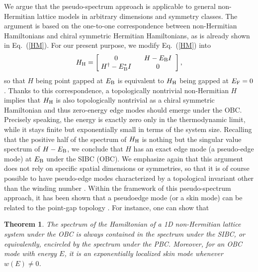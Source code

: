 \documentclass{tADP2e}
\theoremstyle{plain}
\theoremstyle{plain}
\newtheorem{theorem}{Theorem}[section]
\theoremstyle{definition}
\begin{document}
We argue that the pseudo-spectrum approach is applicable to general non-Hermitian lattice models in arbitrary dimensions and symmetry classes. The argument is based on the one-to-one correspondence between non-Hermitian Hamiltonians and chiral symmetric Hermitian Hamiltonians, as is already shown in Eq.~(\ref{HM}). For our present purpose, we modify Eq.~(\ref{HM}) into 
\begin{equation}
H_{\rm H}=\begin{bmatrix} \;0\; & \;\;H-E_{\rm B}I\;\; \\ \;H^\dag-E_{\rm B}^*I\; & \;\;0\;\; \end{bmatrix},
\end{equation}
so that $H$ being point gapped at $E_{\rm B}$ is equivalent to $H_{\rm H}$ being gapped at $E_{\rm F}=0$. Thanks to this correspondence, a topologically nontrivial non-Hermitian $H$ implies that $H_{\rm H}$ is also topologically nontrivial as a chiral symmetric Hamiltonian and thus zero-energy edge modes should emerge under the OBC. Precisely speaking, the energy is exactly zero only in the thermodynamic limit, while it stays finite but exponentially small in terms of the system size. Recalling that the positive half of the spectrum of $H_{\rm H}$ is nothing but the singular value spectrum of $H-E_{\rm B}$, we conclude that $H$ has an exact edge mode (a pseudo-edge mode) at $E_{\rm B}$ under the SIBC (OBC). We emphasize again that this argument does not rely on specific spatial dimensions or symmetries, so that it is of course possible to have pseudo-edge modes characterized by a topological invariant other than the winding number \cite{ON19}. Within the framework of this pseudo-spectrum approach, it has been shown that a pseudoedge mode (or a skin mode) can be related to the point-gap topology \cite{ZG18,KZ19}. For instance, one can show that \cite{NO20}
\begin{theorem}\label{OPSI}
The spectrum of the Hamiltonian of a 1D non-Hermitian lattice system under the OBC is always contained in the spectrum under the SIBC, or equivalently, encircled by the spectrum under the PBC. Moreover, for an OBC mode with energy $E$, it is an exponentially localized skin mode whenever $w(E)\neq0$. 
\end{theorem}
\end{document}
